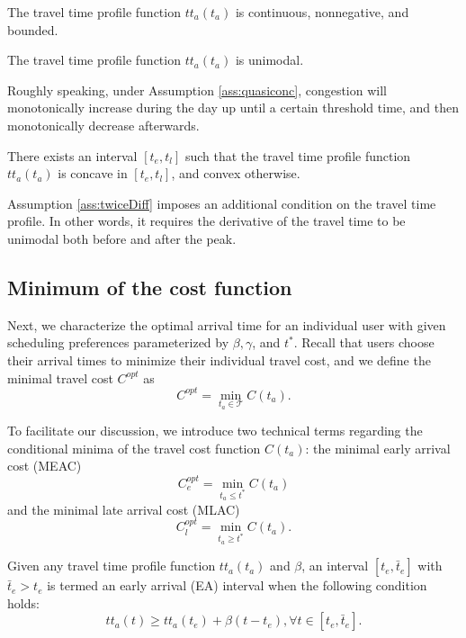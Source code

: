 \begin{assumption}\label{ass:continous}
   The travel time profile function $tt_a(t_a)$ is continuous, nonnegative, and bounded. 
\end{assumption}


\begin{assumption}\label{ass:quasiconc}
   The travel time profile function $tt_a(t_a)$ is unimodal. 
\end{assumption}

Roughly speaking, under Assumption \ref{ass:quasiconc}, congestion will monotonically increase during the day up until a certain threshold time, and then monotonically decrease afterwards. 
 
\begin{assumption}\label{ass:twiceDiff}
  There exists an interval $[t_e, t_l]$ such that the travel time profile function $tt_a(t_a)$ is concave in $[t_e, t_l ]$, and convex otherwise. 
\end{assumption}

Assumption \ref{ass:twiceDiff} imposes an additional condition on the travel time profile. In other words, it requires the derivative of the travel time to be unimodal both before and after the peak.

\subsection{Minimum of the cost function}
\label{sec:cost_minima}

Next, we characterize the optimal arrival time for an individual user with given scheduling preferences parameterized by $\beta, \gamma$, and $t^*$. Recall that users choose their arrival times to minimize their individual travel cost, and we define the minimal travel cost $C^{opt}$ as
    \begin{equation*}
      C^{opt} = \min_{t_a \in \mathcal{T}}C(t_a).
    \end{equation*} 

To facilitate our discussion, we introduce two technical terms regarding the conditional minima of the travel cost function $C(t_a)$: the minimal early arrival cost (MEAC) $$C_e^{opt}  = \min_{t_a \le  t^*}C(t_a)$$ and the minimal late arrival cost (MLAC) $$C_l^{opt} =  \min_{t_a \ge  t^*}C(t_a).$$ 

\begin{definition}\label{def:CEA}
    Given any travel time profile function $tt_a(t_a)$ and \(\beta\),  an interval $[t_e, \bar t_e]$ with $\bar t_e > t_e$ is termed an early arrival (EA) interval when the following condition holds:
\begin{equation}\label{eq:increase_faster}
    tt_a(t ) \ge tt_a(t_e)  + \beta (t - t_e ), \forall t \in [t_e, \bar t_e].
\end{equation} 
\end{definition}

